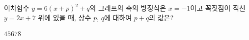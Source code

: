 이차함수 $y=6(x+p)^2+q$의 그래프의 축의 방정식은 $x=-1$이고 꼭짓점이 직선 $y=2x+7$ 위에 있을 때, 상수 $p$, $q$에 대하여 $p+q$의 값은?
\begin{choices32}{$4$}{$5$}{$6$}{$7$}{$8$}\end{choices32}
